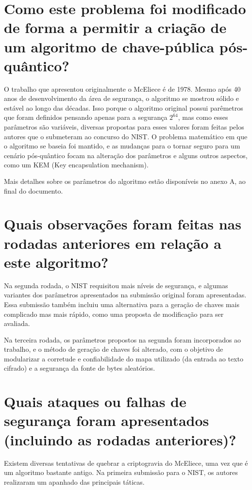 \section*{Como este problema foi modificado de forma a permitir a criação de um algoritmo de chave-pública pós-quântico?}

O trabalho que apresentou originalmente o McEliece é de 1978. Mesmo após 40 anos de desenvolvimento da área de segurança, o algoritmo se mostrou sólido e estável ao longo das décadas. Isso porque o algoritmo original possui parêmetros que foram definidos pensando apenas para a segurança $2^64$, mas como esses parâmetros são variáveis, diversas propostas para esses valores foram feitas pelos autores que o submeteram ao concurso do NIST. O problema matemático em que o algoritmo se baseia foi mantido, e as mudanças para o tornar seguro para um cenário pós-quântico focam na alteração dos parâmetros e alguns outros aspectos, como um KEM (Key encapsulation mechanism).

Mais detalhes sobre os parâmetros do algoritmo estão disponíveis no anexo A, ao final do documento.

\section*{Quais observações foram feitas nas rodadas anteriores em relação a este algoritmo?}

Na segunda rodada, o NIST requisitou mais níveis de segurança, e algumas variantes dos parâmetros apresentados na submissão original foram apresentadas. Essa submissão também incluiu uma alternativa para a geração de chaves mais complicado mas mais rápido, como uma proposta de modificação para ser avaliada.

Na terceira rodada, os parâmetros propostos na segunda foram incorporados ao trabalho, e o método de geração de chaves foi alterado, com o objetivo de modularizar a corretude e confiabilidade do mapa utilizado (da entrada ao texto cifrado) e a segurança da fonte de bytes aleatórios.

\section*{Quais ataques ou falhas de segurança foram apresentados (incluindo as rodadas anteriores)?}

Existem diversas tentativas de quebrar a criptogravia do McEliece, uma vez que é um algoritmo bastante antigo. Na primeira submissão para o NIST, os autores realizaram um apanhado das principais táticas.

